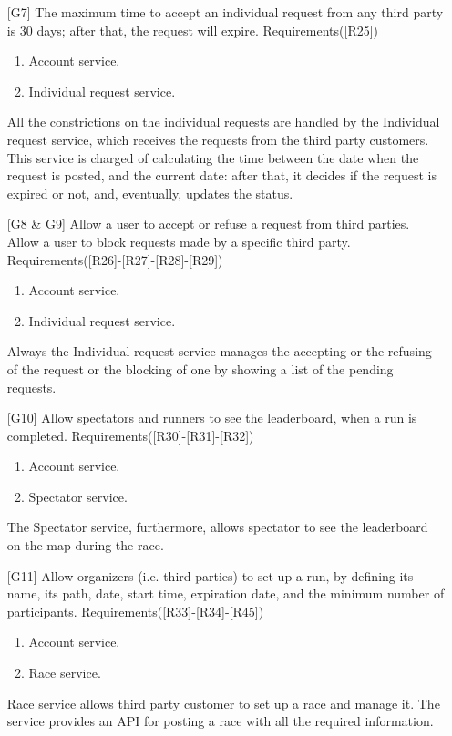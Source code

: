 \begin{itemize}
\item[{[G7]}] The maximum time to accept an individual request from any third party is 30 days; after that, the request will expire. Requirements([R25])
	\begin{enumerate}
	\item Account service.
	\item Individual request service.
	\end{enumerate}
All the constrictions on the individual requests are handled by the Individual request service, which receives the requests from the third
party customers. 
This service is charged of calculating the time between the date when the request is posted, and the current date: after that, it decides if
the request is expired or not, and, eventually, updates the status.

\item[{[G8 \& G9]}] Allow a user to accept or refuse a request from third parties. Allow a user to block requests made by a specific third party. Requirements([R26]-[R27]-[R28]-[R29])
	\begin{enumerate}
	\item Account service.
	\item Individual request service.
	\end{enumerate}
Always the Individual request service manages the accepting or the refusing of the request or the blocking of one by showing a list of the pending requests. 	
	
\item[{[G10]}] Allow spectators and runners to see the leaderboard, when a run is completed. Requirements([R30]-[R31]-[R32])
	\begin{enumerate}
	\item Account service.
	\item Spectator service.
	\end{enumerate}
The Spectator service, furthermore, allows spectator to see the leaderboard on the map during the race. 
	
\item[{[G11]}] Allow organizers (i.e. third parties) to set up a run, by defining its name, its path, date, start time, expiration date, and the minimum number of participants. Requirements([R33]-[R34]-[R45])
	\begin{enumerate}
	\item Account service.
	\item Race service.
	\end{enumerate}
Race service allows third party customer to set up a race and manage it. The service provides an API for posting a race with all the required information.
	

\end{itemize}
